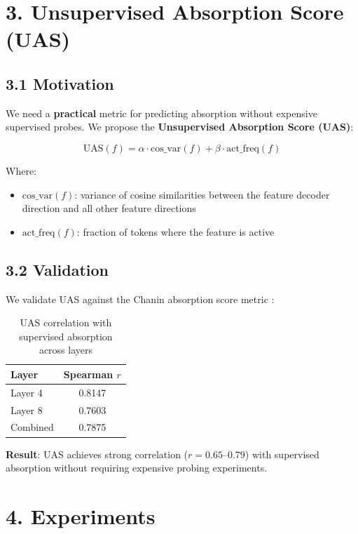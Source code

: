 \documentclass{article}
\newcommand{\UAS}{\text{UAS}}
\newcommand{\cosvar}{\text{cos\_var}}
\newcommand{\freqskew}{\text{act\_freq}}
\begin{document}
\section{3. Unsupervised Absorption Score (UAS)}

\subsection{3.1 Motivation}

We need a \textbf{practical} metric for predicting absorption without expensive supervised probes. We propose the \textbf{Unsupervised Absorption Score (UAS)}:

\begin{equation}
\UAS(f) = \alpha \cdot \cosvar(f) + \beta \cdot \freqskew(f)
\end{equation}

Where:
\begin{itemize}
    \item $\cosvar(f)$: variance of cosine similarities between the feature decoder direction and all other feature directions
    \item $\freqskew(f)$: fraction of tokens where the feature is active
\end{itemize}

\subsection{3.2 Validation}

We validate UAS against the Chanin absorption score metric \citep{Chanin2024}:

\begin{table}[htbp]
\caption{UAS correlation with supervised absorption across layers}
\label{tab:uas-validation}
\centering
\begin{tabular}{lc}
\toprule
Layer & Spearman $r$ \\
\midrule
Layer 4 & 0.8147 \\
Layer 8 & 0.7603 \\
Combined & 0.7875 \\
\bottomrule
\end{tabular}
\end{table}

\textbf{Result}: UAS achieves strong correlation ($r = 0.65$--$0.79$) with supervised absorption without requiring expensive probing experiments.


\section{4. Experiments}
\end{document}
